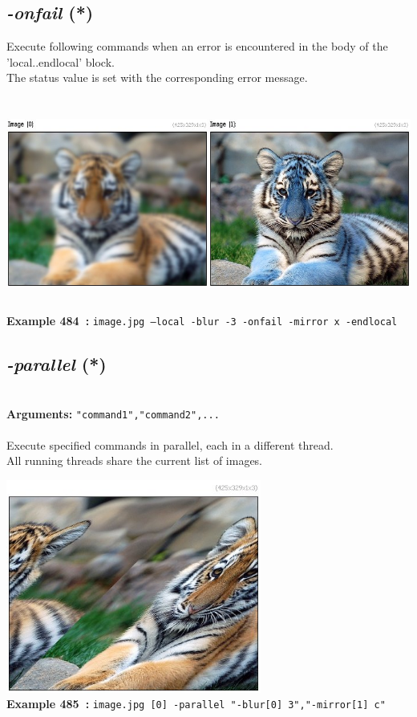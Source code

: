 \documentclass[a4paper,11pt,twoside]{book}
\begin{document}
\subsection{\emph{-onfail} (*)}\vspace*{-0.5em}
Execute following commands when an error is encountered in the body of the 'local..endlocal' block.
~\\The status value is set with the corresponding error message.
\begin{center}\includegraphics[keepaspectratio=true,height=7cm,width=\textwidth]{img/gmic_def484.jpg}\\
{\footnotesize \textbf{Example 484~:} \texttt{image.jpg --local -blur -3 -onfail -mirror x -endlocal}}
\end{center}

\subsection{\emph{-parallel} (*)}\vspace*{-0.5em}
~\\\textbf{Arguments: } 
{\small \texttt{"command1","command2",...}}\\~\\
Execute specified commands in parallel, each in a different thread.
~\\All running threads share the current list of images.
\begin{center}\includegraphics[keepaspectratio=true,height=7cm,width=\textwidth]{img/gmic_def485.jpg}\\
{\footnotesize \textbf{Example 485~:} \texttt{image.jpg [0] -parallel "-blur[0] 3","-mirror[1] c"}}
\end{center}
\end{document}
